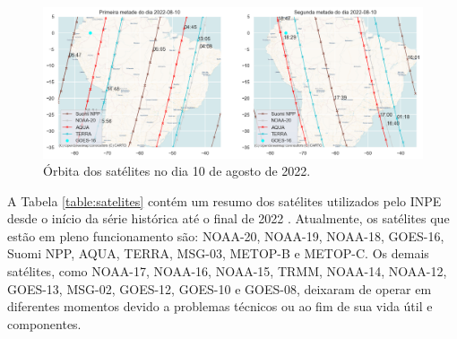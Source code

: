 \documentclass[cic,tc]{iiufrgs}
\begin{document}
\begin{figure}[H]
    \caption{Órbita dos satélites no dia 10 de agosto de 2022.}
    \begin{center}
        \includegraphics[width=35em]{orbita2022-08-10}
    \end{center}
    \label{fig:orbita2022-08-10}
\end{figure}

A Tabela \ref{table:satelites} contém um resumo dos satélites utilizados pelo INPE desde o início da série histórica até o final de 2022 \cite{EmbrapaSatelites}. Atualmente, os satélites que estão em pleno funcionamento são: NOAA-20, NOAA-19, NOAA-18, GOES-16, Suomi NPP, AQUA, TERRA, MSG-03, METOP-B e METOP-C. Os demais satélites, como NOAA-17, NOAA-16, NOAA-15, TRMM, NOAA-14, NOAA-12, GOES-13, MSG-02, GOES-12, GOES-10 e GOES-08, deixaram de operar em diferentes momentos devido a problemas técnicos ou ao fim de sua vida útil e componentes. \par
\end{document}
